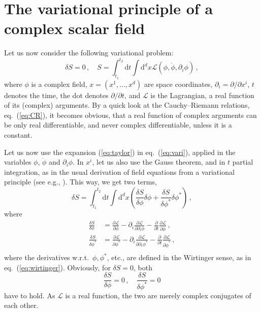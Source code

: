 \documentclass[a4paper,11pt]{article}
\def\d{\mathrm{d}}
\def\lag{{\mathcal{L}}}
\begin{document}
\section{The variational principle of a complex scalar field}\label{sec:cosca}
Let us now consider the following variational problem:
\begin{equation}
  \label{eq:vari}
  \delta S=0\,,\quad S=\int_{t_1}^{t_2} \d t \int \d^d x \mathcal{L}(\phi,\dot{\phi}, \partial_i \phi)\,,
\end{equation}
where $\phi$ is a complex field, $x=(x^1,\dots,x^d)$ are space coordinates, $\partial_i=\partial/\partial x^i$, $t$ denotes the time, the dot denotes $\partial/\partial t$, and $\mathcal{L}$ is the Lagrangian,
a real function of its (complex) arguments. By a quick look at the Cauchy--Riemann relations, eq.\ (\ref{eq:CR}), it becomes obvious, that a real function of complex arguments can be 
only real differentiable, and never complex differentiable, unless it is a constant.

Let us now use the expansion (\ref{eq:taylor}) in eq.\ (\ref{eq:vari}), applied in the variables $\phi$, $\dot{\phi}$ and $\partial_i \phi$. In $x^i$, let us also use the Gauss theorem, and in $t$ partial integration,
as in the usual derivation of field equations from a variational principle (see e.g., \cite{MF, LL}). This way, we get two terms,
\begin{equation}
  \label{eq:vari2}
  \delta S= \int_{t_1}^{t_2} \d t \int \d^d x  \left( \frac{\delta S}{\delta \phi} \delta\phi + \frac{\delta S}{\delta \phi^*} \delta\phi^* \right)\,,
\end{equation}
where
\begin{equation}
  \label{eq:vari2a}
  \begin{aligned}
    \frac{\delta S}{\delta \phi} &= \frac{\partial \lag}{\partial \phi} - \partial_i \frac{\partial \lag}{\partial\partial_i\phi} - \frac{\partial}{\partial t}\frac{\partial \lag}{\partial \dot{\phi}}\,,\\
    \frac{\delta S}{\delta \phi^*} &= \frac{\partial \lag}{\partial \phi^*} - \partial_i \frac{\partial \lag}{\partial\partial_i\phi^*} - \frac{\partial}{\partial t}\frac{\partial \lag}{\partial {\dot{\phi}}^*}\,,\\
  \end{aligned}
\end{equation}
where the derivatives w.r.t.\ $\phi,\phi^*$, etc., are defined in the Wirtinger sense, as in eq.\ (\ref{eq:wirtinger}). Obviously, for $\delta S=0$, both
\begin{equation}
  \label{eq:fieldeq}
  \frac{\delta S}{\delta\phi} =0\,,\quad \frac{\delta S}{\delta\phi^*} =0
\end{equation}
have to hold. As $\mathcal{L}$ is a real function, the two are merely complex conjugates of each other.
\end{document}
